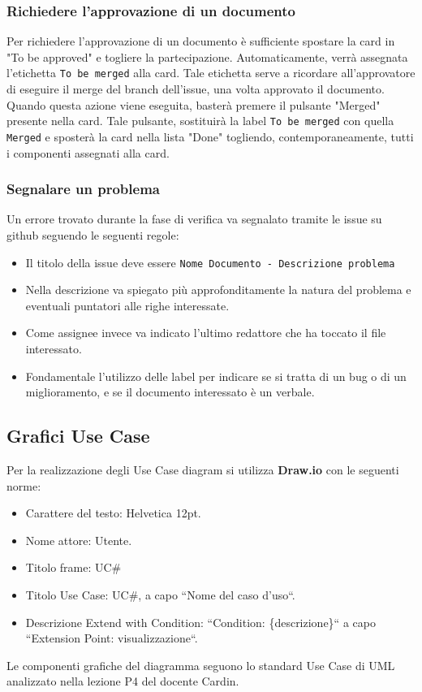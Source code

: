 \subsubsection{Richiedere l'approvazione di un documento}
Per richiedere l'approvazione di un documento è sufficiente spostare la card in "To be approved" e togliere la partecipazione. Automaticamente, verrà assegnata l'etichetta \texttt{To be merged} alla card. Tale etichetta serve a ricordare all'approvatore di eseguire il merge del branch dell'issue, una volta approvato il documento.
Quando questa azione viene eseguita, basterà premere il pulsante "Merged" presente nella card. Tale pulsante, sostituirà la label \texttt{To be merged} con quella \texttt{Merged} e sposterà la card nella lista "Done" togliendo, contemporaneamente, tutti i componenti assegnati alla card.


\subsubsection{Segnalare un problema}
Un errore trovato durante la fase di verifica va segnalato tramite le issue su github
seguendo le seguenti regole:
\begin{itemize}
    \item Il titolo della issue deve essere
    \texttt{Nome Documento - Descrizione problema}
    \item Nella descrizione va spiegato più approfonditamente la natura del
    problema e eventuali puntatori alle righe interessate.
    \item  Come assignee invece va indicato l'ultimo redattore che ha toccato il file
    interessato.
    \item Fondamentale l'utilizzo delle label per indicare se si tratta
    di un bug o di un miglioramento, e se il documento interessato è un verbale.
\end{itemize}

\subsection{Grafici Use Case}
Per la realizzazione degli Use Case diagram si utilizza \textbf{Draw.io} con le seguenti norme:
\begin{itemize}
\item Carattere del testo: Helvetica 12pt.
\item Nome attore: Utente.
\item Titolo frame: UC\#
\item Titolo Use Case: UC\#, a capo ``Nome del caso d'uso``.
\item Descrizione Extend with Condition: ``Condition: \{descrizione\}`` a capo ``Extension Point: visualizzazione``.
\end{itemize}
Le componenti grafiche del diagramma seguono lo standard Use Case di UML analizzato nella lezione P4 del docente Cardin. \\

